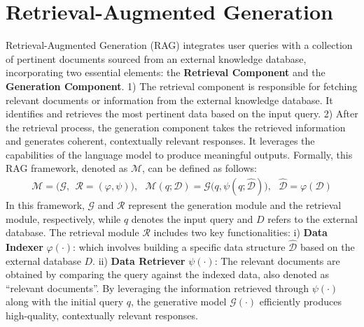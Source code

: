 \documentclass{article} %
\begin{document}
\section{Retrieval-Augmented Generation}
\label{sec:model}
Retrieval-Augmented Generation (RAG) integrates user queries with a collection of pertinent documents sourced from an external knowledge database, incorporating two essential elements: the \textbf{Retrieval Component} and the \textbf{Generation Component}. 1) The retrieval component is responsible for fetching relevant documents or information from the external knowledge database. It identifies and retrieves the most pertinent data based on the input query. 2) After the retrieval process, the generation component takes the retrieved information and generates coherent, contextually relevant responses. It leverages the capabilities of the language model to produce meaningful outputs.
Formally, this RAG framework, denoted as $\mathcal{M}$, can be defined as follows:
\begin{align}
    \mathcal{M} = \Big( \mathcal{G}, ~~ \mathcal{R}=(\varphi, \psi) \Big),~~~
    \mathcal{M}(q; \mathcal{D}) = \mathcal{G}\Big(q, \psi(q; \hat{\mathcal{D}})\Big),~~~\hat{\mathcal{D}} = \varphi(\mathcal{D})
\end{align}
In this framework, $\mathcal{G}$ and $\mathcal{R}$ represent the generation module and the retrieval module, respectively, while $q$ denotes the input query and $D$ refers to the external database. The retrieval module $\mathcal{R}$ includes two key functionalities: i) \textbf{Data Indexer} $\varphi (\cdot)$: which involves building a specific data structure $\hat{\mathcal{D}}$ based on the external database $D$. ii) \textbf{Data Retriever} $\psi(\cdot)$: The relevant documents are obtained by comparing the query against the indexed data, also denoted as ``relevant documents''. By leveraging the information retrieved through $\psi(\cdot)$ along with the initial query $q$, the generative model $\mathcal{G}(\cdot)$ efficiently produces high-quality, contextually relevant responses.
\end{document}
